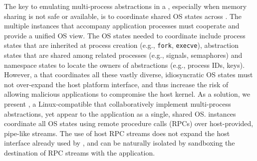 

The key to emulating multi-process abstractions in a \libos{},
especially when memory sharing is not safe or available,
is to coordinate shared OS states
across \picoprocs{}.
The multiple \libos{} instances that accompany application processes
must cooperate and provide a unified OS view.
The OS states needed to coordinate
include process states that are inherited at process creation
(e.g., {\tt fork}, {\tt execve}),
abstraction states that are shared among related processes
(e.g., signals, \sysvipc{} semaphores)
and namespace states to locate the owners of abstractions
(e.g., process IDs, \sysvipc{} keys).
However, a \libos{} that coordinates all these vastly diverse, idiosyncratic OS states
must not over-expand the host platform interface,
and thus increase the risk of
allowing malicious applications to compromise the host kernel.
As a solution, we present \term{\graphene{}},
a Linux-compatible \libos{} that collaboratively implement
multi-process abstractions,
yet appear to the application as a single, shared OS.
\graphene{} instances coordinate all OS states using remote procedure calls (RPCs) over
host-provided, pipe-like streams.
The use of host RPC streams
does not expand the host interface already used by \graphene{},
and can be naturally isolated
by sandboxing the destination of RPC streams
with the application.





